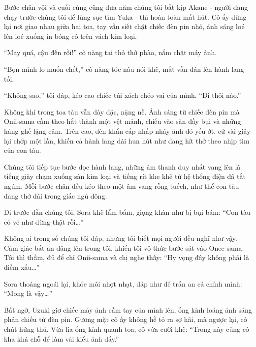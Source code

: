 \documentclass[../main.tex]{subfiles}
\begin{document}


Bước chân vội vã cuối cùng cũng đưa năm chúng tôi bắt kịp Akane - người đang chạy trước chúng tôi để lùng sục tìm Yuka - thì hoàn toàn mất hút. Cô ấy dừng lại nơi giao nhau giữa hai toa, tay vẫn siết chặt chiếc đèn pin nhỏ, ánh sáng loé lên loé xuống in bóng cô trên vách kim loại.

``May quá, cậu đến rồi!'' cô nàng tai thỏ thở phào, nắm chặt máy ảnh.

``Bọn mình lo muốn chết,'' cô nàng tóc nâu nói khẽ, mắt vẫn dán lên hành lang tối.

``Không sao,'' tôi đáp, kéo cao chiếc túi xách chéo vai của mình. ``Đi thôi nào.''

Không khí trong toa tàu vẫn dày đặc, nặng nề. Ánh sáng từ chiếc đèn pin mà Onii-sama cầm theo hắt thành một vệt mảnh, chiếu vào sàn đầy bụi và những hàng ghế lặng câm. Trên cao, đèn khẩn cấp nhấp nháy ánh đỏ yếu ớt, cứ vài giây lại chớp một lần, khiến cả hành lang dài hun hút như đang hít thở theo nhịp tim của con tàu.

Chúng tôi tiếp tục bước dọc hành lang, những âm thanh duy nhất vang lên là tiếng giày chạm xuống sàn kim loại và tiếng rít khe khẽ từ hệ thống điện đã tắt ngúm. Mỗi bước chân đều kéo theo một âm vang rỗng tuếch, như thể con tàu đang thở dài trong giấc ngủ đông.

Đi trước dẫn chúng tôi, Sora khẽ lẩm bẩm, giọng khàn như bị bụi bám: ``Con tàu có vẻ như dừng thật rồi\dots''

Không ai trong số chúng tôi đáp, nhưng tôi biết mọi người đều nghĩ như vậy. Cảm giác bất an dâng lên trong tôi, khiến tôi vô thức bước sát vào Onee-sama. Tôi thì thầm, đủ để chỉ Onii-sama và chị nghe thấy: ``Hy vọng đây không phải là điềm xấu\dots''

Sora thoáng ngoái lại, khóe môi nhợt nhạt, đáp như để trấn an cả chính mình: ``Mong là vậy\dots''

Bất ngờ, Uzuki giơ chiếc máy ảnh cầm tay của mình lên, ống kính loáng ánh sáng phản chiếu từ đèn pin. Gương mặt cô ấy không hề tỏ ra sợ hãi, mà ngược lại, có chút hứng thú. Vừa lia ống kính quanh toa, cô vừa cười khẽ: ``Trong này cũng có kha khá chỗ để làm vài kiểu ảnh đấy.''
\end{document}
